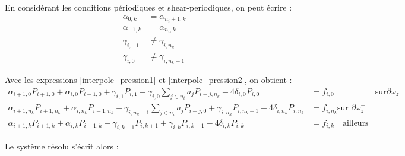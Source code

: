 En considérant les conditions périodiques et shear-periodiques, on peut écrire :
\begin{align}
\alpha_{0,k}&=\alpha_{n_i+1,k}\\
\alpha_{-1,k}&=\alpha_{n_i,k}\\
\gamma_{i,-1}&\neq\gamma_{i,n_k}\label{symet_condition}\\
\gamma_{i,0}&\neq\gamma_{i,n_k+1}\label{symet_condition2}
\end{align}


Avec les expressions \eqref{interpole_pression1} et \eqref{interpole_pression2}, on obtient :
\begin{align*}
\alpha_{i+1,0}P_{i+1,0}+\alpha_{i,0}P_{i-1,0}+\gamma_{i,1}P_{i,1}+\gamma_{i,0}\sum_{j\in n_{i}}a_jP_{i+j,n_k}-4\delta_{i,0}P_{i,0}&= f_{i,0}&\text{sur}\partial\omega_z^-\\
\alpha_{i+1,n_k} P_{i+1,n_k}+\alpha_{i,n_k}P_{i-1,n_k}+\gamma_{i,n_k+1}\sum_{j\in n_{i}}a_jP_{i-j,0}+\gamma_{i,n_k}P_{i,n_k-1}-4\delta_{i,n_k}P_{i,n_k} &=  f_{i,n_k} \text{sur }\partial\omega_z^+ \\ 
\alpha_{i+1,k}P_{i+1,k}+\alpha_{i,k}P_{i-1,k}+\gamma_{i,k+1}P_{i,k+1}+\gamma_{i,k}P_{i,k-1}-4\delta_{i,k}P_{i,k}&=f_{i,k}\quad\text{ailleurs}
\end{align*}

Le système résolu s'écrit alors :

